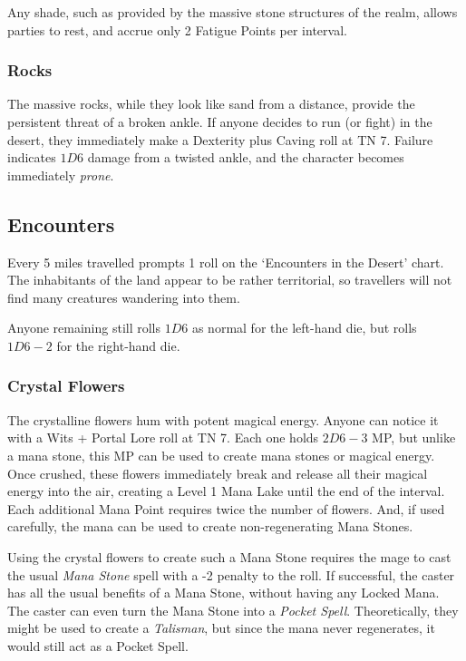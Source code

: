 \begin{multicols}{2}
Any shade, such as provided by the massive stone structures of the realm, allows parties to rest, and accrue only 2 Fatigue Points per \gls{interval}.

\subsubsection{Rocks}

The massive rocks, while they look like sand from a distance, provide the persistent threat of a broken ankle.
If anyone decides to run (or fight) in the desert, they immediately make a Dexterity plus Caving roll at TN 7.
Failure indicates $1D6$ damage from a twisted ankle, and the character becomes immediately \emph{prone}.

\subsection{Encounters}

Every 5 miles travelled prompts 1 roll on the `Encounters in the Desert' chart.
The inhabitants of the land appear to be rather territorial, so travellers will not find many creatures wandering into them.

Anyone remaining still rolls $1D6$ as normal for the left-hand die,%
but rolls $1D6-2$ for the right-hand die.


\subsubsection{Crystal Flowers}
\label{crystalFlowers}

The crystalline flowers hum with potent magical energy.
Anyone can notice it with a Wits + Portal Lore roll at TN 7.
Each one holds $2D6-3$ MP, but unlike a mana stone, this MP can be used to create mana stones or magical energy.
Once crushed, these flowers immediately break and release all their magical energy into the air, creating a Level 1 Mana Lake until the end of the \gls{interval}.
Each additional Mana Point requires twice the number of flowers.
And, if used carefully, the mana can be used to create non-regenerating Mana Stones.

Using the crystal flowers to create such a Mana Stone requires the mage to cast the usual \textit{Mana Stone} spell with a -2 penalty to the roll.
If successful, the caster has all the usual benefits of a Mana Stone, without having any Locked Mana.
The caster can even turn the Mana Stone into a \textit{Pocket Spell}.
Theoretically, they might be used to create a \textit{Talisman}, but since the mana never regenerates, it would still act as a Pocket Spell.


\end{multicols}
